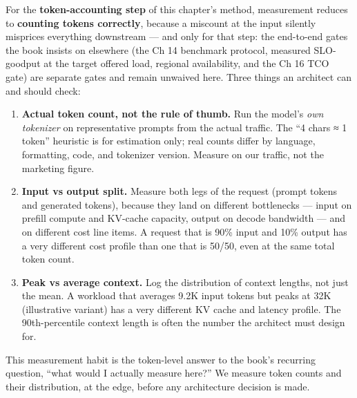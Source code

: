 \label{measurement}


For the \textbf{token-accounting step} of this chapter's method,
measurement reduces to \textbf{counting tokens correctly}, because a
miscount at the input silently misprices everything downstream --- and
only for that step: the end-to-end gates the book insists on elsewhere
(the Ch 14 benchmark protocol, measured SLO-goodput at the target
offered load, regional availability, and the Ch 16 TCO gate) are
separate gates and remain unwaived here. Three things an architect can
and should check:

\begin{enumerate}
\def\labelenumi{\arabic{enumi}.}
\item
  \textbf{Actual token count, not the rule of thumb.} Run the model's
  \emph{own tokenizer} on representative prompts from the actual
  traffic. The ``4 chars ≈ 1 token'' heuristic is for estimation only;
  real counts differ by language, formatting, code, and tokenizer
  version. Measure on our traffic, not the marketing figure.
\item
  \textbf{Input vs output split.} Measure both legs of the request
  (prompt tokens and generated tokens), because they land on different
  bottlenecks --- input on prefill compute and KV-cache capacity, output
  on decode bandwidth --- and on different cost line items. A request
  that is 90\% input and 10\% output has a very different cost profile
  than one that is 50/50, even at the same total token count.
\item
  \textbf{Peak vs average context.} Log the distribution of context
  lengths, not just the mean. A workload that averages 9.2K input tokens
  but peaks at 32K (illustrative variant) has a very different KV cache
  and latency profile. The 90th-percentile context length is often the
  number the architect must design for.
\end{enumerate}

This measurement habit is the token-level answer to the book's recurring
question, ``what would I actually measure here?'' We measure token
counts and their distribution, at the edge, before any architecture
decision is made.

\label{common-mistakes}


